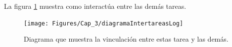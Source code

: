 La figura \ref{fig:diag_InterTaskLogs} muestra como interactúa entre las demás tareas.
\begin{figure}[h!]
	\centering
	\texttt{[image: Figures/Cap\_3/diagramaIntertareasLog]}
	\caption{Diagrama que muestra la vinculación entre estas tarea y las demás.}
	\label{fig:diag_InterTaskLogs}
\end{figure}






